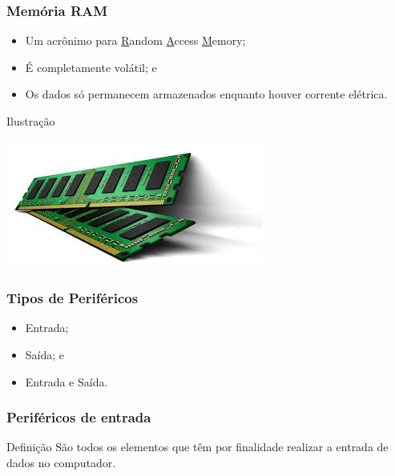 \documentclass[aspectratio=169]{beamer} %
\begin{document}
\begin{frame}
	\frametitle{Memória RAM}
		
	\begin{itemize}
		\item Um acrônimo para \underline{R}andom \underline{A}ccess \underline{M}emory; 
		\item É completamente volátil; e
		\item Os dados só permanecem armazenados enquanto houver corrente elétrica.
	\end{itemize}\vfill
	
	\begin{exampleblock}{Ilustra\c cão}
		\begin{center}
			\includegraphics[scale=0.4]{img/ram}
		\end{center}		
	\end{exampleblock}
\end{frame}

\begin{frame}
	\frametitle{Tipos de Periféricos}
		
	\begin{itemize}
		\item Entrada;
		\item Saída; e
		\item Entrada e Saída.
	\end{itemize}
\end{frame}

\begin{frame}
	\frametitle{Periféricos de entrada}
	
	\begin{block}{Defini\c cão}
		São todos os elementos que têm por finalidade realizar a entrada de dados no computador.
	\end{block}\vfill
\end{frame}
\end{document}
